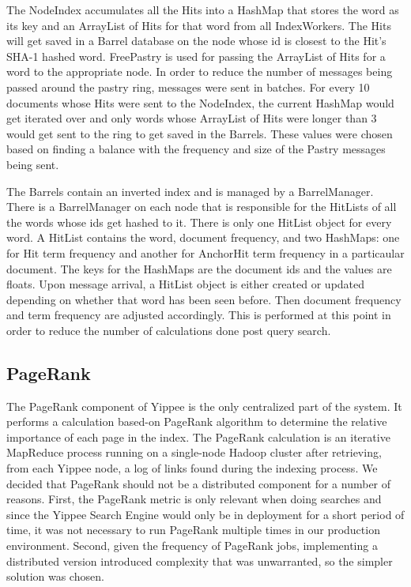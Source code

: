 \documentclass[11pt, letterpaper, oneside, twocolumn]{article}
\begin{document}
The NodeIndex accumulates all the Hits into a HashMap that stores the word as its key and an ArrayList of Hits for that word from all IndexWorkers. 
The Hits will get saved in a Barrel database on the node whose id is closest to the Hit’s SHA-1 hashed word. 
FreePastry is used for passing the ArrayList of Hits for a word to the appropriate node. 
In order to reduce the number of messages being passed around the pastry ring, messages were sent in batches. 
For every 10 documents whose Hits were sent to the NodeIndex, the current HashMap would get iterated over and only words whose ArrayList of Hits were longer than 3 would get sent to the ring to get saved in the Barrels. 
These values were chosen based on finding a balance with the frequency and size of the Pastry messages being sent. 


The Barrels contain an inverted index and is managed by a BarrelManager. 
There is a BarrelManager on each node that is responsible for the HitLists of all the words whose ids get hashed to it. There is only one HitList object for every word. 
A HitList contains the word, document frequency, and two HashMaps: one for Hit term frequency and another for AnchorHit term frequency in a particaular document. 
The keys for the HashMaps are the document ids and the values are floats. 
Upon message arrival, a HitList object is either created or updated depending on whether that word has been seen before. 
Then document frequency and term frequency are adjusted accordingly. 
This is performed at this point in order to reduce the number of calculations done post query search.  

\subsection{PageRank}

The PageRank component of Yippee is the only centralized part of the system.
It performs a calculation based-on PageRank algorithm\cite{pagerank} to determine the relative importance of each page in the index.
The PageRank calculation is an iterative MapReduce process running on a single-node Hadoop cluster after retrieving, from each Yippee node, a log of links found during the indexing process.
We decided that PageRank should not be a distributed component for a number of  reasons. 
First, the PageRank metric is only relevant when doing searches and since the Yippee Search Engine would only be in deployment for a short period of time, it was not necessary to run PageRank multiple times in our production environment.
Second, given the frequency of PageRank jobs, implementing a distributed version introduced complexity that was unwarranted, so the simpler solution was chosen.
\end{document}
